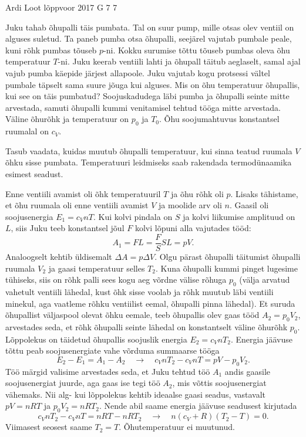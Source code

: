 {Ardi Loot} %
{lõppvoor} %
{2017} %
{G 7} %
{7} %
{
\ifStatement
Juku tahab õhupalli täis pumbata. Tal on suur pump, mille otsas olev ventiil on alguses suletud. Ta paneb pumba otsa õhupalli, seejärel vajutab pumbale peale, kuni rõhk pumbas tõuseb $p$-ni. Kokku surumise tõttu tõuseb pumbas oleva õhu temperatuur $T$-ni. Juku keerab ventiili lahti ja õhupall täitub aeglaselt, samal ajal vajub pumba käepide järjest allapoole. Juku vajutab kogu protsessi vältel pumbale täpselt sama suure jõuga kui alguses. Mis on õhu temperatuur õhupallis, kui see on täis pumbatud? Soojuskadudega läbi pumba ja õhupalli seinte mitte arvestada, samuti õhupalli kummi venitamisel tehtud tööga mitte arvestada. Väline õhurõhk ja temperatuur on $p_0$ ja $T_0$. Õhu soojumahtuvus konstantsel ruumalal on $c_V$.
\fi


\ifHint
Tasub vaadata, kuidas muutub õhupalli temperatuur, kui sinna teatud ruumala $V$ õhku sisse pumbata. Temperatuuri leidmiseks saab rakendada termodünaamika esimest seadust.
\fi


\ifSolution
Enne ventiili avamist oli õhk temperatuuril $T$ ja õhu rõhk oli $p$. Lisaks tähistame, et õhu ruumala oli enne ventiili avamist $V$ ja moolide arv oli $n$. Gaasil oli soojusenergia $E_1=c_VnT$. Kui kolvi pindala on $S$ ja kolvi liikumise amplituud on $L$, siis Juku teeb konstantsel jõul $F$ kolvi lõpuni alla vajutades tööd:
$$A_1=FL=\frac{F}{S}SL=pV.$$
Analoogselt kehtib üldisemalt $\Delta A = p \Delta V$. Olgu pärast õhupalli täitumist õhupalli ruumala $V_2$ ja gaasi temperatuur selles $T_2$. Kuna õhupalli kummi pinget lugesime tühiseks, siis on rõhk palli sees kogu aeg võrdne välise rõhuga $p_0$ (välja arvatud vahetult ventiili lähedal, kust õhk sisse voolab ja rõhk muutub läbi ventiili minekul, aga vaatleme rõhku ventiilist eemal, õhupalli pinna lähedal). Et suruda õhupallist väljaspool olevat õhku eemale, teeb õhupallis olev gaas tööd $A_2=p_0V_2$, arvestades seda, et rõhk õhupalli seinte lähedal on konstantselt väline õhurõhk $p_0$. Lõppolekus on täidetud õhupallis soojuslik energia $E_2=c_VnT_2$. Energia jäävuse tõttu peab soojusenergiate vahe võrduma summaarse tööga
$$E_2-E_1 = A_1-A_2 \quad\rightarrow\quad c_VnT_2-c_VnT = pV - p_0V_2.$$
Töö märgid valisime arvestades seda, et Juku tehtud töö $A_1$ andis gaasile soojusenergiat juurde, aga gaas ise tegi töö $A_2$, mis võttis soojusenergiat vähemaks. Nii alg- kui lõppolekus kehtib ideaalse gaasi seadus, vastavalt $pV=nRT$ ja $p_0V_2=nRT_2$. Nende abil saame energia jäävuse seadusest kirjutada
$$c_VnT_2-c_VnT = nRT-nRT_2 \quad\rightarrow\quad n(c_V+R)(T_2-T)=0.$$
Viimasest seosest saame $T_2=T$. Õhutemperatuur ei muutunud.
\fi


}
